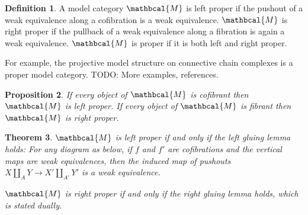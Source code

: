 \documentclass{scrartcl}
\let\emph\relax
\theoremstyle{plain}
\newtheorem{theorem}{Theorem}[section]
\newtheorem{proposition}[theorem]{Proposition}
\theoremstyle{definition}
\newtheorem{definition}[theorem]{Definition}
\newcommand{\cat}[1]{\mathbcal{#1}}
\newcommand{\nto}{\Rightarrow}
\renewcommand{\coprod}{\mathbin{\amalg}}
\DeclareMathOperator{\Ho}{Ho}
\newcommand{\comp}{\mathbin{\circ}}
\begin{document}
\begin{definition}
    A model category $\cat M$ is left proper if the pushout of a weak equivalence along a cofibration is a weak equivalence. $\cat M$ is right proper if the pullback of a weak equivalence along a fibration is again a weak equivalence. $\cat M$ is proper if it is both left and right proper.
\end{definition}

For example, the projective model structure on connective chain complexes is a proper model category. TODO: More examples, references.

\begin{proposition}
    If every object of $\cat M$ is cofibrant then $\cat M$ is left proper. If every object of $\cat M$ is fibrant then $\cat M$ is right proper.
\end{proposition}

\begin{theorem}
    $\cat M$ is left proper if and only if the left gluing lemma holds: For any diagram as below, if $f$ and $f'$ are cofibrations and the vertical maps are weak equivalences, then the induced map of pushouts $X\coprod_A Y\to X'\coprod_{A'} Y'$ is a weak equivalence.

    \begin{center}
    \end{center}


    $\cat M$ is right proper if and only if the right gluing lemma holds, which is stated dually.
\end{theorem}

    
\end{document}
